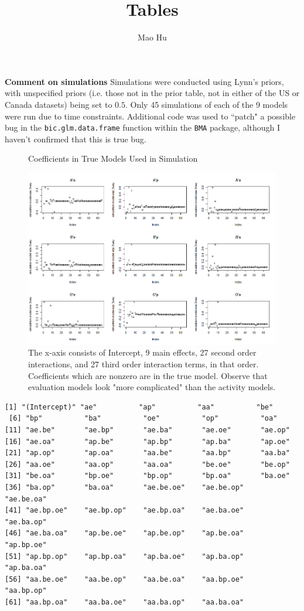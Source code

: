\documentclass[]{article}
\title{Tables}
\author{Mao Hu}
\begin{document}
\maketitle

\textbf{Comment on simulations}
Simulations were conducted using Lynn's priors, with unspecified priors (i.e. those not in the prior table, not in either of the US or Canada datasets) being set to $0.5$.  Only 45 simulations of each of the 9 models were run due to time constraints.  Additional code was used to ``patch" a possible bug in the \texttt{bic.glm.data.frame} function within the \texttt{BMA} package, although I haven't confirmed that this is true bug.

\begin{figure}[h]
\caption{Coefficients in True Models Used in Simulation}
\includegraphics[width=15cm]{Rplot.png}
\caption{The x-axis consists of Intercept, 9 main effects, 27 second order interactions, and 27 third order interaction terms, in that order.  Coefficients which are nonzero are in the true model. Observe that evaluation models look "more complicated" than the activity models. }
\end{figure}
\begin{verbatim}
[1] "(Intercept)" "ae"          "ap"          "aa"          "be"         
 [6] "bp"          "ba"          "oe"          "op"          "oa"         
[11] "ae.be"       "ae.bp"       "ae.ba"       "ae.oe"       "ae.op"      
[16] "ae.oa"       "ap.be"       "ap.bp"       "ap.ba"       "ap.oe"      
[21] "ap.op"       "ap.oa"       "aa.be"       "aa.bp"       "aa.ba"      
[26] "aa.oe"       "aa.op"       "aa.oa"       "be.oe"       "be.op"      
[31] "be.oa"       "bp.oe"       "bp.op"       "bp.oa"       "ba.oe"      
[36] "ba.op"       "ba.oa"       "ae.be.oe"    "ae.be.op"    "ae.be.oa"   
[41] "ae.bp.oe"    "ae.bp.op"    "ae.bp.oa"    "ae.ba.oe"    "ae.ba.op"   
[46] "ae.ba.oa"    "ap.be.oe"    "ap.be.op"    "ap.be.oa"    "ap.bp.oe"   
[51] "ap.bp.op"    "ap.bp.oa"    "ap.ba.oe"    "ap.ba.op"    "ap.ba.oa"   
[56] "aa.be.oe"    "aa.be.op"    "aa.be.oa"    "aa.bp.oe"    "aa.bp.op"   
[61] "aa.bp.oa"    "aa.ba.oe"    "aa.ba.op"    "aa.ba.oa"   
\end{verbatim}
\end{document}
